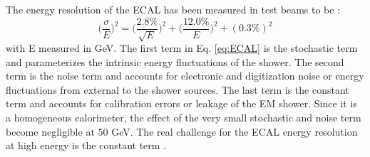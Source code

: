 \indent The energy resolution of the ECAL has been measured in test beams to be \cite{CMS:2008xjf}:
\begin{equation}\label{eq:ECAL}
    \bigg( \frac{\sigma}{E}\bigg)^2 = \bigg(\frac{2.8\%}{\sqrt{E}}\bigg)^2 + \bigg(\frac{12.0\%}{E}\bigg)^2 + (0.3\%)^2
\end{equation}
with E measured in GeV. The first term in Eq. \ref{eq:ECAL} is the stochastic term and parameterizes the intrinsic energy fluctuations of the shower. The second term is the noise term and accounts for electronic and digitization noise or energy fluctuations from external to the shower sources. The last term is the constant term and accounts for calibration errors or leakage of the EM shower. Since it is a homogeneous calorimeter, the effect of the very small stochastic and noise term become negligible at $50$ GeV. The real challenge for the ECAL energy resolution at high energy is the constant term \cite{Cavallari_2011}.
